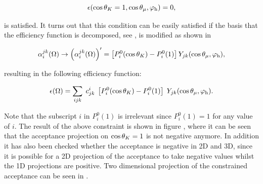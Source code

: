 \begin{equation}
  \centering
  \epsilon(\cos\thetaK = 1, \cos\thetamu, \phihel) = 0,
  \label{eff_func_constr}
\end{equation}

\noindent is satisfied. It turns out that this condition can be easily satisfied if the basis that the
efficiency function is decomposed, see , is modified as shown in 

\begin{align}
  \centering
   \effbase \to \parenthesis{\effbase}^\prime = \left[\legendre{i}{0}-P_i^0(1)\right] \spharm{j}{k},
  \label{eff_basis_transform}
  \end{align}

\noindent resulting in the following efficiency function:

\begin{align}
    \centering
  \epsilon(\Omega) = \sum_{ijk} \; \moment{i}{j}{k} \; \left[\legendre{i}{0}-P_i^0(1)\right] \; \spharm{j}{k}.
  \label{eff_func_new}
\end{align}

\noindent Note that the subscript $i$ in $P_i^0(1)$ is irrelevant since $P_i^0(1)=1$ for any value of $i$.
The result of the above constraint is shown in figure , where it can be seen that
the acceptance projection on $\cos\theta_{K}=1$ is not negative anymore. In addition it has also been checked
whether the acceptance is negative in 2D and 3D, since it is possible for a 2D projection of the acceptance
to take negative values whilst the 1D projections are positive. Two dimensional projection of the constrained
acceptance can be seen in .

